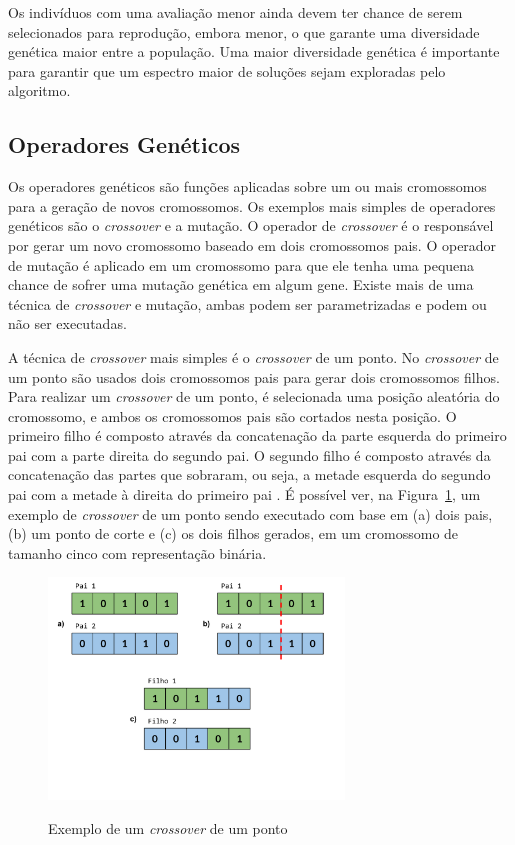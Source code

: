 \documentclass[12pt,oneside,a4paper,english,french,spanish,brazil,]{abntex2}
\begin{document}
Os indivíduos com uma avaliação menor ainda devem ter chance de serem selecionados para reprodução, embora menor, o que garante uma diversidade genética maior entre a população. Uma maior diversidade genética é importante para garantir que um espectro maior de soluções sejam exploradas pelo algoritmo.

\subsection{Operadores Genéticos}

Os operadores genéticos são funções aplicadas sobre um ou mais cromossomos para a geração de novos cromossomos. Os exemplos mais simples de operadores genéticos são o \textit{crossover} e a mutação. O operador de \textit{crossover} é o responsável por gerar um novo cromossomo baseado em dois cromossomos pais. O operador de mutação é aplicado em um cromossomo para que ele tenha uma pequena chance de sofrer uma mutação genética em algum gene. Existe mais de uma técnica de \textit{crossover} e mutação, ambas podem ser parametrizadas e podem ou não ser executadas.

A técnica de \textit{crossover} mais simples é o \textit{crossover} de um ponto. No \textit{crossover} de um ponto são usados dois cromossomos pais para gerar dois cromossomos filhos. Para realizar um \textit{crossover} de um ponto, é selecionada uma posição aleatória do cromossomo, e ambos os cromossomos pais são cortados nesta posição. O primeiro filho é composto através da concatenação da parte esquerda do primeiro pai com a parte direita do segundo pai. O segundo filho é composto através da concatenação das partes que sobraram, ou seja, a metade esquerda do segundo pai com a metade à direita do primeiro pai \cite{linden:2008}. É possível ver, na Figura~\ref{fig:GA_Crossover_de_um_ponto}, um exemplo de \textit{crossover}  de um ponto sendo executado com base em (a) dois pais, (b) um ponto de corte e (c) os dois filhos gerados, em um cromossomo de tamanho cinco com representação binária.

\begin{figure}[ht]
\centering
\caption{Exemplo de um \textit{crossover} de um ponto}
\includegraphics[width=0.7\textwidth]{imagens/GA_Crossover_de_um_ponto.pdf}
\label{fig:GA_Crossover_de_um_ponto}
\end{figure}
\end{document}
